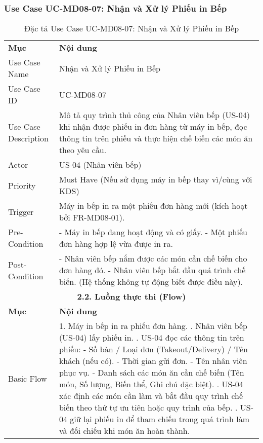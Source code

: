 \subsubsection{Use Case UC-MD08-07: Nhận và Xử lý Phiếu in Bếp}

\begin{longtable}{|m{4cm}|p{11cm}|}
\caption{Đặc tả Use Case UC-MD08-07: Nhận và Xử lý Phiếu in Bếp} \label{tab:uc_md08_07} \\
\hline

\endhead %
\hline
\endfoot %
\hline
\endlastfoot %
\multicolumn{2}{|c|}{\textbf{2.1. Tóm tắt (Summary)}} \\
\hline
\textbf{Mục} & \textbf{Nội dung} \\
\hline
Use Case Name & Nhận và Xử lý Phiếu in Bếp \\
\hline
Use Case ID & UC-MD08-07 \\
\hline
Use Case Description & Mô tả quy trình thủ công của Nhân viên bếp (US-04) khi nhận được phiếu in đơn hàng từ máy in bếp, đọc thông tin trên phiếu và thực hiện chế biến các món ăn theo yêu cầu. \\
\hline
Actor & US-04 (Nhân viên bếp) \\
\hline
Priority & Must Have (Nếu sử dụng máy in bếp thay vì/cùng với KDS) \\
\hline
Trigger & Máy in bếp in ra một phiếu đơn hàng mới (kích hoạt bởi FR-MD08-01). \\
\hline
Pre-Condition & - Máy in bếp đang hoạt động và có giấy. \newline - Một phiếu đơn hàng hợp lệ vừa được in ra. \\
\hline
Post-Condition & - Nhân viên bếp nắm được các món cần chế biến cho đơn hàng đó. \newline - Nhân viên bếp bắt đầu quá trình chế biến. (Hệ thống không tự động biết được điều này). \\
\hline
\multicolumn{2}{|c|}{\textbf{2.2. Luồng thực thi (Flow)}} \\
\hline
\textbf{Mục} & \textbf{Nội dung} \\
\hline
Basic Flow & 1. Máy in bếp in ra phiếu đơn hàng. \newline 2. Nhân viên bếp (US-04) lấy phiếu in. \newline 3. US-04 đọc các thông tin trên phiếu: \newline    - Số bàn / Loại đơn (Takeout/Delivery) / Tên khách (nếu có). \newline    - Thời gian gửi đơn. \newline    - Tên nhân viên phục vụ. \newline    - Danh sách các món ăn cần chế biến (Tên món, Số lượng, Biến thể, Ghi chú đặc biệt). \newline 4. US-04 xác định các món cần làm và bắt đầu quy trình chế biến theo thứ tự ưu tiên hoặc quy trình của bếp. \newline 5. US-04 giữ lại phiếu in để tham chiếu trong quá trình làm và đối chiếu khi món ăn hoàn thành. \\

\end{longtable}
